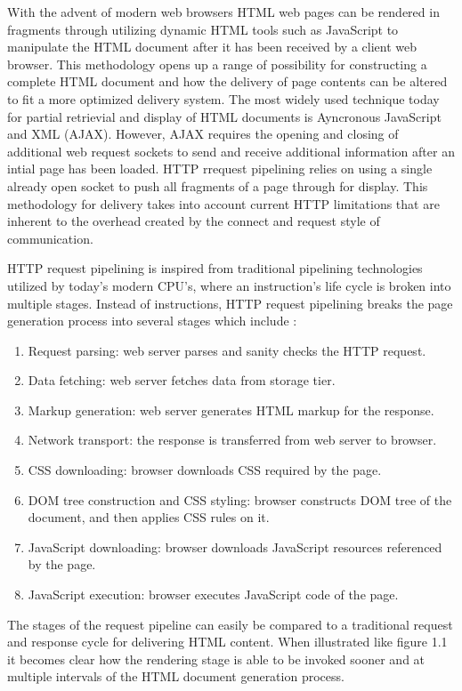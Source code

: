 \documentclass[12pt]{report}
\begin{document}
With the advent of modern web browsers HTML web pages can be rendered in fragments through utilizing dynamic HTML tools such as JavaScript to manipulate the HTML document after it has been received by a client web browser. This methodology opens up a range of possibility for constructing a complete HTML document and how the delivery of page contents can be altered to fit a more optimized delivery system. The most widely used technique today for partial retrievial and display of HTML documents is Ayncronous JavaScript and XML (AJAX). However, AJAX requires the opening and closing of additional web request sockets to send and receive additional information after an intial page has been loaded. HTTP rrequest pipelining relies on using a single already open socket to push all fragments of a page through for display. This methodology for delivery takes into account current HTTP limitations that are inherent to the overhead created by the connect and request style of communication.

HTTP request pipelining is inspired from traditional pipelining technologies utilized by today’s modern CPU's, where an instruction's life cycle is broken into multiple stages. Instead of instructions, HTTP request pipelining breaks the page generation process into several stages which include \cite{facebookBigpipe}:

\begin{enumerate}
  \item Request parsing: web server parses and sanity checks the HTTP request. 
  \item Data fetching: web server fetches data from storage tier.
  \item Markup generation: web server generates HTML markup for the response. 
  \item Network transport: the response is transferred from web server to browser.
  \item CSS downloading: browser downloads CSS required by the page. 
  \item DOM tree construction and CSS styling: browser constructs DOM tree of the document, and then applies CSS rules on it.
  \item JavaScript downloading: browser downloads JavaScript resources referenced by the page.
  \item JavaScript execution: browser executes JavaScript code of the page.
\end{enumerate}

The stages of the request pipeline can easily be compared to a traditional request and response cycle for delivering HTML content. When illustrated like figure 1.1 it becomes clear how  the rendering stage is able to be invoked sooner and at multiple intervals of the HTML document generation process.
\end{document}
